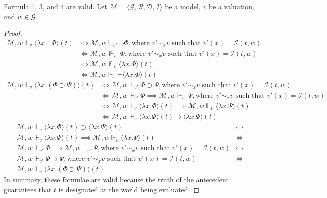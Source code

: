 Formula 1, 3, and 4 are valid. Let $\mathcal{M} = \langle \mathcal{G}, \mathcal{R}, \mathcal{D}, \mathcal{I} \rangle$ be a model, $v$ be a valuation, and $w \in \mathcal{G}$.
\begin{proof}
\begin{align*}
\mathcal{M}, w \Vdash_{v} \langle \lambda x. \neg\Phi \rangle(t)
&\iff \mathcal{M}, w \Vdash_{v'} \neg\Phi, \text{where $v' \sim_x v$ such that $v'(x) = \mathcal{I}(t, w)$} \\
&\iff \mathcal{M}, w \not\Vdash_{v'} \Phi, \text{where $v' \sim_x v$ such that $v'(x) = \mathcal{I}(t, w)$} \\
&\iff \mathcal{M}, w \not\Vdash_{v} \langle \lambda x. \Phi \rangle(t) \\
&\iff \mathcal{M}, w \Vdash_{v} \neg \langle \lambda x. \Phi \rangle(t)
\end{align*}
\begin{align*}
\mathcal{M}, w \Vdash_{v} \langle \lambda x. (\Phi \supset \Psi) \rangle(t)
&\iff \mathcal{M}, w \Vdash_{v'} \Phi \supset \Psi, \text{where $v' \sim_x v$ such that $v'(x) = \mathcal{I}(t, w)$} \\
&\iff \mathcal{M}, w \Vdash_{v'} \Phi \implies \mathcal{M}, w \Vdash_{v'} \Psi, \text{where $v' \sim_x v$ such that $v'(x) = \mathcal{I}(t, w)$} \\
&\iff \mathcal{M}, w \Vdash_{v} \langle \lambda x. \Phi \rangle(t) \implies \mathcal{M}, w \Vdash_{v} \langle \lambda x. \Psi \rangle(t) \\
&\iff \mathcal{M}, w \Vdash_{v} \langle \lambda x. \Phi \rangle(t) \supset \langle \lambda x. \Psi \rangle(t)
\end{align*}
\begin{align*}
\mathcal{M}, w \Vdash_{v} \langle \lambda x. \Phi \rangle(t) \supset \langle \lambda x. \Psi \rangle(t) &\iff \\
\mathcal{M}, w \Vdash_{v} \langle \lambda x. \Phi \rangle(t) \implies \mathcal{M}, w \Vdash_{v} \langle \lambda x. \Psi \rangle(t) &\iff \\
\mathcal{M}, w \Vdash_{v'} \Phi \implies \mathcal{M}, w \Vdash_{v'} \Psi, \text{where $v' \sim_x v$ such that $v'(x) = \mathcal{I}(t, w)$} &\iff \\
\mathcal{M}, w \Vdash_{v'} \Phi \supset \Psi, \text{where $v' \sim_x v$ such that $v'(x) = \mathcal{I}(t, w)$} &\iff \\
\mathcal{M}, w \Vdash_{v} \langle \lambda x. (\Phi \supset \Psi) \rangle(t)
\end{align*}
In summary, these formulae are valid because the truth of the antecedent guarantees that $t$ is designated at the world being evaluated.
\end{proof}
